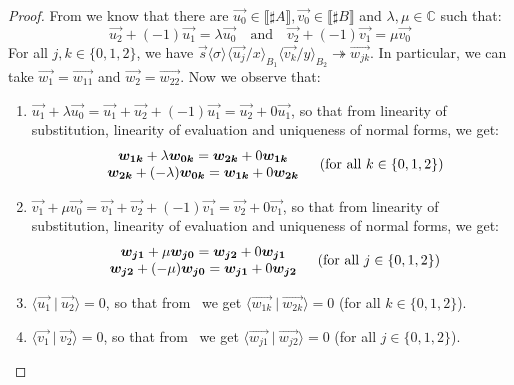 \documentclass[runningheads,orivec]{llncs}
\newcommand\ansubst[2]{\ensuremath{\langle #1 \rangle_{#2}}}
\def\C{\mathbb{C}}            %
\def\scal#1#2{\langle{#1}~|~{#2}\rangle}
\def\eval{\twoheadrightarrow}
\def\sem#1{\llbracket#1\rrbracket}
\begin{document}
\begin{proof}
    From  we know that there are $\vec{u_0}\in\sem{\sharp A}, \vec{v_0}\in\sem{\sharp B}$ and $\lambda,\mu\in\C$ such that:
    \[
    \vec{u_2} + (-1) \vec{u_1} = \lambda\vec{u_0}\quad\text{and}\quad\vec{v_2} + (-1) \vec{v_1} = \mu \vec{v_0}
    \]
    For all $j,k\in\{0,1,2\}$, we have $\vec{s}\ansubst{\sigma}{}\ansubst{\vec{u_j}/x}{B_1}\ansubst{\vec{v_k}/y}{B_2}\eval\vec{w_{jk}}$. In particular, we can take $\vec{w_1}=\vec{w_{11}}$ and $\vec{w_2}=\vec{w_{22}}$. Now we observe that:
    \begin{enumerate}
        \item\label{A8:it1} $\vec{u_1}+\lambda\vec{u_0}= \vec{u_1} + \vec{u_2} + (-1) \vec{u_1}= \vec{u_2} + 0\vec{u_1}$, so that from linearity of substitution, linearity of evaluation and uniqueness of normal forms, we get:
        \[
        \begin{array}{c c}
            \begin{array}{c}
                \vec{w_{1k}} + \lambda\vec{w_{0k}} = \vec{w_{2k}} + 0 \vec{w_{1k}}\\
                \vec{w_{2k}} + (-\lambda)\vec{w_{0k}} = \vec{w_{1k}} + 0 \vec{w_{2k}}
            \end{array}&
            (\text{for all }k\in\{0,1,2\})
        \end{array}
        \]
        
        \item\label{A8:it2} $\vec{v_1}+\mu\vec{v_0}= \vec{v_1} + \vec{v_2} + (-1) \vec{v_1}= \vec{v_2} + 0\vec{v_1}$, so that from linearity of substitution, linearity of evaluation and uniqueness of normal forms, we get:
        \[
        \begin{array}{c c}
            \begin{array}{c}
                \vec{w_{j1}} + \mu\vec{w_{j0}} = \vec{w_{j2}} + 0 \vec{w_{j1}}\\
                \vec{w_{j2}} + (-\mu)\vec{w_{j0}} = \vec{w_{j1}} + 0 \vec{w_{j2}}
            \end{array}&
            (\text{for all }j\in\{0,1,2\})
        \end{array}
        \]
        
        \item\label{A8:it3} $\scal{\vec{u_1}}{\vec{u_2}}=0$, so that from ~we get $\scal{\vec{w_{1k}}}{\vec{w_{2k}}}=0$ (for all $k\in\{0,1,2\}$).
        
        \item\label{A8:it4} $\scal{\vec{v_1}}{\vec{v_2}}=0$, so that from ~we get $\scal{\vec{w_{j1}}}{\vec{w_{j2}}}=0$ (for all $j\in\{0,1,2\}$).
    \end{enumerate}


\end{proof}
\end{document}
